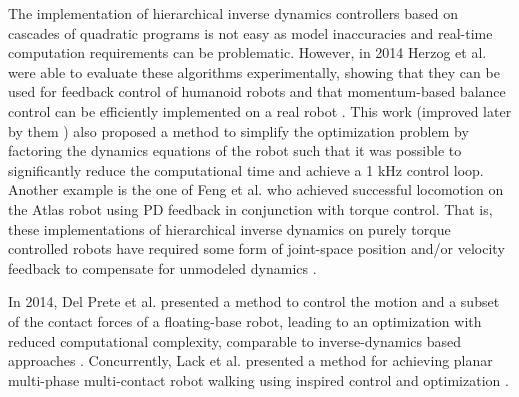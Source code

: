 	The implementation of hierarchical inverse dynamics controllers based on cascades of quadratic programs
	is not easy as model inaccuracies and real-time computation requirements can be problematic.
	However, in 2014 Herzog et al. \cite{Herzog_IROS2014} were able to evaluate these algorithms experimentally,
	showing that they can be used for feedback control of humanoid robots and that momentum-based
	balance control can be efficiently implemented on a real robot \cite{Herzog_IROS2014}.
	This work (improved later by them \cite{Herzog_Humanoids2015} \cite{Herzog_AutoRobots2016}) also proposed a
	method to simplify the optimization problem by factoring the dynamics equations	of the robot such that it was
	possible to	significantly reduce the computational time and achieve a 1 kHz control loop.
	Another example is the one of Feng et al. \cite{Feng_Humanoids2014} who achieved successful locomotion on
	the Atlas robot using PD feedback in conjunction with torque control.
	That is, these implementations of hierarchical inverse dynamics on purely torque controlled robots have
	required some form of joint-space position and/or velocity feedback to compensate for unmodeled dynamics
	\cite{Hopkins_ICRA2015}.
	
	In 2014, Del Prete et al. \cite{DelPrete_IROS2014} presented a method to control the motion and
	a subset of the contact forces of a floating-base robot, leading to an optimization with reduced
	computational complexity, comparable to inverse-dynamics based approaches \cite{DelPrete_IROS2014}.
	Concurrently, Lack et al. \cite{Lack_ICRA2014} presented a method for achieving planar multi-phase
	multi-contact robot walking using inspired control and optimization \cite{Lack_ICRA2014}.
	
